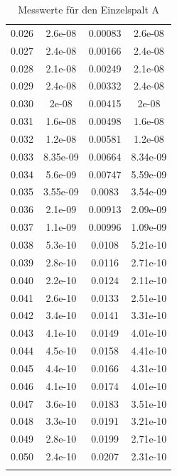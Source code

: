 \documentclass[11pt,ngerman,a4paper]{article}
\begin{document}
\begin{longtable}{SSSS}
0.026 & 2.6e-08 & 0.00083 & 2.6e-08\\
0.027 & 2.4e-08 & 0.00166 & 2.4e-08\\
0.028 & 2.1e-08 & 0.00249 & 2.1e-08\\
0.029 & 2.4e-08 & 0.00332 & 2.4e-08\\
0.030 & 2e-08 & 0.00415 & 2e-08\\
0.031 & 1.6e-08 & 0.00498 & 1.6e-08\\
0.032 & 1.2e-08 & 0.00581 & 1.2e-08\\
0.033 & 8.35e-09 & 0.00664 & 8.34e-09\\
0.034 & 5.6e-09 & 0.00747 & 5.59e-09\\
0.035 & 3.55e-09 & 0.0083 & 3.54e-09\\
0.036 & 2.1e-09 & 0.00913 & 2.09e-09\\
0.037 & 1.1e-09 & 0.00996 & 1.09e-09\\
0.038 & 5.3e-10 & 0.0108 & 5.21e-10\\
0.039 & 2.8e-10 & 0.0116 & 2.71e-10\\
0.040 & 2.2e-10 & 0.0124 & 2.11e-10\\
0.041 & 2.6e-10 & 0.0133 & 2.51e-10\\
0.042 & 3.4e-10 & 0.0141 & 3.31e-10\\
0.043 & 4.1e-10 & 0.0149 & 4.01e-10\\
0.044 & 4.5e-10 & 0.0158 & 4.41e-10\\
0.045 & 4.4e-10 & 0.0166 & 4.31e-10\\
0.046 & 4.1e-10 & 0.0174 & 4.01e-10\\
0.047 & 3.6e-10 & 0.0183 & 3.51e-10\\
0.048 & 3.3e-10 & 0.0191 & 3.21e-10\\
0.049 & 2.8e-10 & 0.0199 & 2.71e-10\\
0.050 & 2.4e-10 & 0.0207 & 2.31e-10\\
\bottomrule
\caption{Messwerte für den Einzelspalt A}
\end{longtable}
\end{document}
